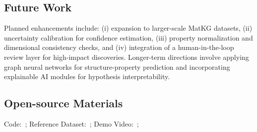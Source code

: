 \subsection*{Future Work}

Planned enhancements include: (i) expansion to larger-scale MatKG datasets, (ii) uncertainty calibration for confidence estimation, (iii) property normalization and dimensional consistency checks, and (iv) integration of a human-in-the-loop review layer for high-impact discoveries. Longer-term directions involve applying graph neural networks for structure-property prediction and incorporating explainable AI modules for hypothesis interpretability.

\subsection*{Open-source Materials}

\noindent Code: \,; Reference Dataset: \,; Demo Video: \,;






